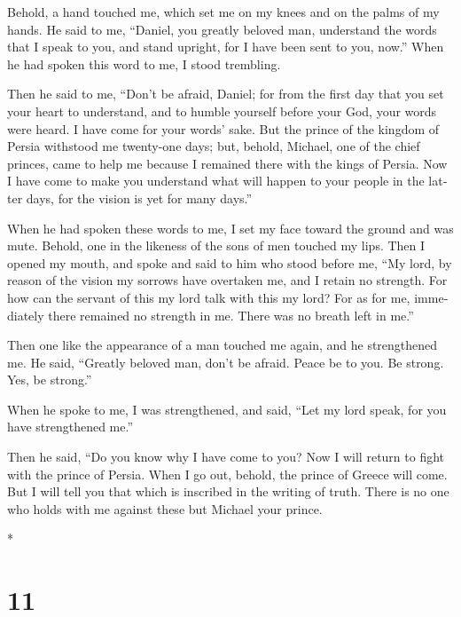 \begin{paracol}{2}
\begin{otherlanguage}{english}
 Behold, a hand touched me, which set me on my knees and
on the palms of my hands.  He said to me, ``Daniel, you
greatly beloved man, understand the words that I speak to you, and stand
upright, for I have been sent to you, now.'' When he had spoken this
word to me, I stood trembling.

 Then he said to me, ``Don't be afraid, Daniel; for from
the first day that you set your heart to understand, and to humble
yourself before your God, your words were heard. I have come for your
words' sake.  But the prince of the kingdom of Persia
withstood me twenty-one days; but, behold, Michael, one of the chief
princes, came to help me because I remained there with the kings of
Persia.  Now I have come to make you understand what will
happen to your people in the latter days, for the vision is yet for many
days.''

 When he had spoken these words to me, I set my face
toward the ground and was mute.  Behold, one in the
likeness of the sons of men touched my lips. Then I opened my mouth, and
spoke and said to him who stood before me, ``My lord, by reason of the
vision my sorrows have overtaken me, and I retain no strength.
 For how can the servant of this my lord talk with this
my lord? For as for me, immediately there remained no strength in me.
There was no breath left in me.''

 Then one like the appearance of a man touched me again,
and he strengthened me.  He said, ``Greatly beloved man,
don't be afraid. Peace be to you. Be strong. Yes, be strong.''

When he spoke to me, I was strengthened, and said, ``Let my lord speak,
for you have strengthened me.''

 Then he said, ``Do you know why I have come to you? Now
I will return to fight with the prince of Persia. When I go out, behold,
the prince of Greece will come.  But I will tell you that
which is inscribed in the writing of truth. There is no one who holds
with me against these but Michael your prince.

\end{otherlanguage}

\switchcolumn[0]*

\hypertarget{section-20}{%
\section{11}\label{section-20}}


\end{paracol}
